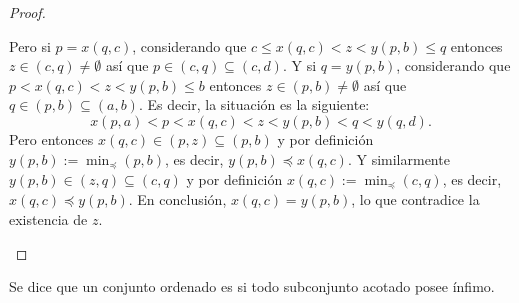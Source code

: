 \documentclass[topologia-analisis.tex]{subfiles}
\begin{document}
\begin{proof}
\begin{enumerate}[a)]
			Pero si $p = x(q, c)$, considerando que $c \le x(q, c) < z < y(p, b) \le q$ entonces $z \in (c, q) \ne \emptyset$
			así que $p \in (c, q) \subseteq (c, d)$.
			Y si $q = y(p, b)$, considerando que $p < x(q, c) < z < y(p, b) \le b$ entonces $z \in (p, b) \ne \emptyset$
			así que $q \in (p, b) \subseteq (a, b)$.
			Es decir, la situación es la siguiente:
			$$ x(p, a) < p < x(q, c) < z < y(p, b) < q < y(q, d). $$
			Pero entonces $x(q, c) \in (p, z) \subseteq (p, b)$ y por definición $y(p, b) := \min_\preceq(p, b)$, es decir, $y(p, b) \preceq x(q, c)$.
			Y similarmente $y(p, b) \in (z, q) \subseteq (c, q)$ y por definición $x(q, c) := \min_\preceq(c, q)$, es decir, $x(q, c) \preceq y(p, b)$.
			En conclusión, $x(q, c) = y(p, b)$, lo que contradice la existencia de $z$. \qedhere
	\end{enumerate}
\end{proof}
\thmdep{}

\begin{mydef}
	Se dice que un conjunto ordenado es  si todo subconjunto acotado posee ínfimo.
\end{mydef}
\end{document}
